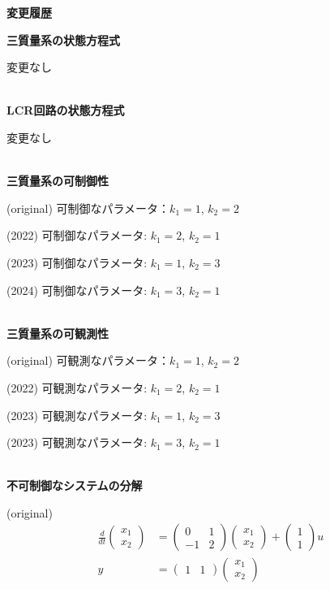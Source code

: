 



\begin{center}
	{\Large \bf 変更履歴}
\end{center}
	

\noindent
{\bf 三質量系の状態方程式}

変更なし

\ \\ \noindent
{\bf LCR回路の状態方程式}

変更なし

\ \\ \noindent
{\bf 三質量系の可制御性}

(original) 可制御なパラメータ：$k_1=1$, $k_2=2$

(2022) 可制御なパラメータ:{\color{red} $k_1=2$, $k_2=1$}

(2023) 可制御なパラメータ:{\color{red} $k_1=1$, $k_2=3$}

(2024) 可制御なパラメータ:{\color{red} $k_1=3$, $k_2=1$}

\ \\ \noindent
{\bf 三質量系の可観測性}

(original) 可観測なパラメータ：$k_1=1$, $k_2=2$

(2022) 可観測なパラメータ:{\color{red} $k_1=2$, $k_2=1$}

(2023) 可観測なパラメータ:{\color{red} $k_1=1$, $k_2=3$}

(2023) 可観測なパラメータ:{\color{red} $k_1=3$, $k_2=1$}

\ \\ \noindent
{\bf 不可制御なシステムの分解}

(original)
\begin{align*}
	\frac{d}{dt}
	\left (
	\begin{array}{c}
	 x_1 \\ x_2 
	\end{array}
	\right )
	& = 
	\left (
	\begin{array}{cc}
	 0 & 1 \\
	 -1 & 2
	\end{array}
	\right )
	\left (
	\begin{array}{c}
	 x_1 \\ x_2 
	\end{array}
	\right )
	+
	\left (
	\begin{array}{c}
	 1 \\ 1 
	\end{array}
	\right )
	u
\\
	y 
	&=
	\left (
	\begin{array}{cc}
	 1 & 1  
	\end{array}
	\right )
	\left (
	\begin{array}{c}
	 x_1 \\ x_2 
	\end{array}
	\right )
\end{align*}

